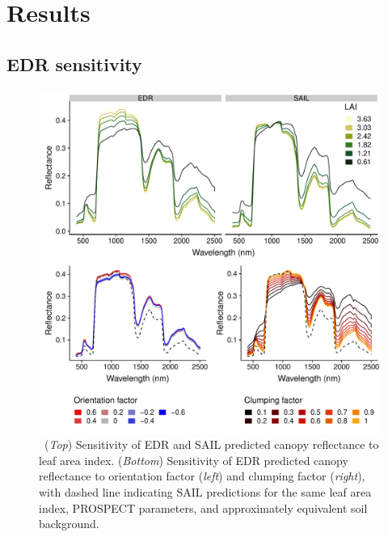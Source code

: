 \section{Results}

\subsection{EDR sensitivity}

\begin{figure}
  \centering
  \includegraphics[width=\textwidth]{4_edr/figures/explore_spectra/sensitivity_single_pft.pdf}
  \caption{\
    (\textit{Top}) Sensitivity of EDR and SAIL predicted canopy reflectance to leaf area index.
    (\textit{Bottom}) Sensitivity of EDR predicted canopy reflectance to orientation factor (\textit{left}) and clumping factor (\textit{right}),
    with dashed line indicating SAIL predictions for the same leaf area index, PROSPECT parameters, and approximately equivalent soil background.
  }\label{fig:sensitivity}
\end{figure}

